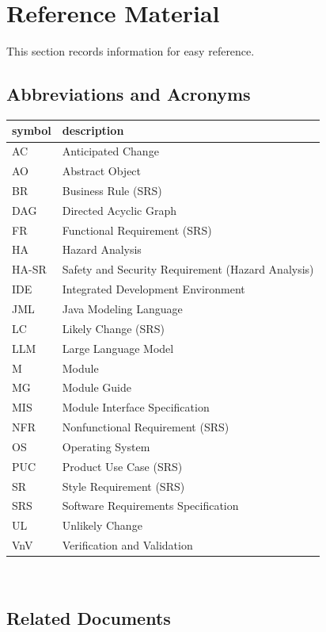 \documentclass[12pt, titlepage]{article}
\begin{document}
\newpage

\section{Reference Material}

This section records information for easy reference.

\subsection{Abbreviations and Acronyms}

\renewcommand{\arraystretch}{1.2}
\begin{tabular}{l l}
  \toprule
  \textbf{symbol} & \textbf{description}\\
  \midrule
  AC & Anticipated Change\\
  AO & Abstract Object\\
  BR & Business Rule (SRS)\\
  DAG & Directed Acyclic Graph\\
  FR & Functional Requirement (SRS)\\
  HA & Hazard Analysis\\
  HA-SR & Safety and Security Requirement (Hazard Analysis)\\
  IDE & Integrated Development Environment\\
  JML & Java Modeling Language\\
  LC & Likely Change (SRS)\\
  LLM & Large Language Model\\
  M & Module\\
  MG & Module Guide\\
  MIS & Module Interface Specification\\
  NFR & Nonfunctional Requirement (SRS)\\
  OS & Operating System\\
  PUC & Product Use Case (SRS)\\
  SR & Style Requirement (SRS)\\
  SRS & Software Requirements Specification\\
  UL & Unlikely Change\\
  VnV & Verification and Validation\\
  \bottomrule
\end{tabular}\\

\subsection{Related Documents}
\end{document}

